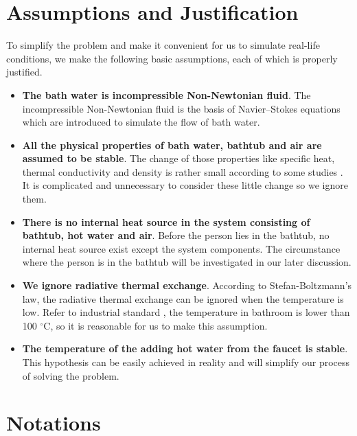 \documentclass{mcmthesis}
\begin{document}
\section{Assumptions and Justification}

To simplify the problem and make it convenient for us to simulate real-life conditions, we make the following basic assumptions, each of which is properly justified.

\begin{itemize}
\item {\bf The bath water is incompressible Non-Newtonian fluid}. The incompressible Non-Newtonian fluid is the basis of Navier–Stokes equations which are introduced to simulate the flow of bath water.

\item {\bf All the physical properties of bath water, bathtub and air are assumed to be stable}. The change of those properties like specific heat, thermal conductivity and density is rather small according to some studies \cite{5}. It is complicated and unnecessary to consider these little change so we ignore them.

\item {\bf There is no internal heat source in the system consisting of bathtub, hot water and air}. Before the person lies in the bathtub, no internal heat source exist except the system components. The circumstance where the person is in the bathtub will be investigated in our later discussion.

\item {\bf We ignore radiative thermal exchange}. According to Stefan-Boltzmann’s law, the radiative thermal exchange can be ignored when the temperature is low. Refer to industrial standard \cite{6}, the temperature in bathroom is lower than 100 $^{\circ}$C, so it is reasonable for us to make this assumption.

\item {\bf The temperature of the adding hot water from the faucet is stable}. This hypothesis can be easily achieved in reality and will simplify our process of solving the problem.
\end{itemize}

\section{Notations}
\end{document}
